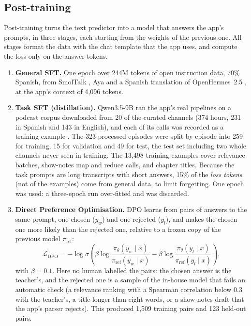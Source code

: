 \subsection*{Post-training}

Post-training turns the text predictor into a model that answers the app's prompts, in three stages, each starting from the weights of the previous one. All stages format the data with the chat template that the app uses, and compute the loss only on the answer tokens.
\begin{enumerate}
\item \textbf{General SFT.} One epoch over 244M tokens of open instruction data, 70\% Spanish, from SmolTalk \cite{allal2025smollm2}, Aya \cite{singh2024aya} and a Spanish translation \cite{openhermes_es} of OpenHermes~2.5 \cite{openhermes2023}, at the app's context of 4{,}096 tokens.
\item \textbf{Task SFT (distillation).} Qwen3.5-9B ran the app's real pipelines on a podcast corpus downloaded from 20 of the curated channels (374 hours, 231 in Spanish and 143 in English), and each of its calls was recorded as a training example \cite{kim2016seqkd}. The 323 processed episodes were split by episode into 259 for training, 15 for validation and 49 for test, the test set including two whole channels never seen in training. The 13{,}498 training examples cover relevance batches, show-notes map and reduce calls, and chapter titles. Because the task prompts are long transcripts with short answers, 15\% of the \textit{loss tokens} (not of the examples) come from general data, to limit forgetting. One epoch was used: a three-epoch run over-fitted and was discarded.
\item \textbf{Direct Preference Optimisation.} DPO \cite{rafailov2023dpo} learns from pairs of answers to the same prompt, one chosen ($y_w$) and one rejected ($y_l$), and makes the chosen one more likely than the rejected one, relative to a frozen copy of the previous model $\pi_{\text{ref}}$:
\begin{equation}
\mathcal{L}_{\text{DPO}} = -\log \sigma\!\left(\beta \log\frac{\pi_\theta(y_w\mid x)}{\pi_{\text{ref}}(y_w\mid x)} - \beta \log\frac{\pi_\theta(y_l\mid x)}{\pi_{\text{ref}}(y_l\mid x)}\right),
\label{eq:dpo}
\end{equation}
with $\beta = 0.1$. Here no human labelled the pairs: the chosen answer is the teacher's, and the rejected one is a sample of the in-house model that fails an automatic check (a relevance ranking with a Spearman correlation below 0.3 with the teacher's, a title longer than eight words, or a show-notes draft that the app's parser rejects). This produced 1{,}509 training pairs and 123 held-out pairs.
\end{enumerate}

